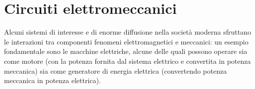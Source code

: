 \documentclass[letterpaper,10pt,english]{jupyterBook}
\begin{document}
\section{Circuiti elettromeccanici}
\label{\detokenize{ch/circuits-electromechanic:circuiti-elettromeccanici}}\label{\detokenize{ch/circuits-electromechanic:classical-electromagnetism-circuits-electromechanic}}\label{\detokenize{ch/circuits-electromechanic::doc}}
\sphinxAtStartPar
Alcuni sistemi di interesse e di enorme diffusione nella società moderna sfruttano le interazioni tra componenti fenomeni elettromagnetici e meccanici: un esempio fondamentale sono le macchine elettriche, alcune delle quali possono operare sia come motore (con la potenza fornita dal sistema elettrico e convertita in potenza meccanica) sia come generatore di energia elettrica (convertendo potenza meccanica in potenza elettrica).
\end{document}
